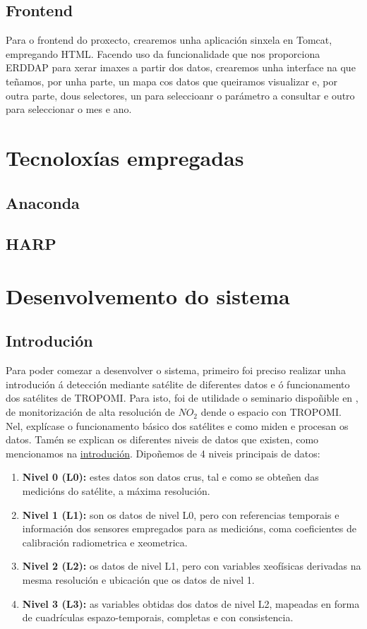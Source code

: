 \subsection{Frontend}\label{frontend}
Para o frontend do proxecto, crearemos unha aplicación sinxela en Tomcat, empregando HTML. Facendo uso da funcionalidade que nos proporciona ERDDAP para xerar imaxes a partir dos datos, crearemos
unha interface na que teñamos, por unha parte, un mapa cos datos que queiramos visualizar e, por outra parte, dous selectores, un para seleccioanr o parámetro a consultar e outro para seleccionar
o mes e ano.

\section{Tecnoloxías empregadas}\label{tecnoloxias}
\subsection{Anaconda}\label{anaconda}

\subsection{HARP}\label{harp}

\section{Desenvolvemento do sistema}\label{desenvolvemento}
\subsection{Introdución}
Para poder comezar a desenvolver o sistema, primeiro foi preciso realizar unha introdución á detección mediante satélite de diferentes datos e ó funcionamento dos satélites de TROPOMI. Para isto,
foi de utilidade o seminario dispoñible en \cite{ARSETformation}, de monitorización de alta resolución de $NO_2$ dende o espacio con TROPOMI. Nel, explícase o funcionamento básico dos satélites e
como miden e procesan os datos. Tamén se explican os diferentes niveis de datos que existen, como mencionamos na \hyperref[introducion]{introdución}. Dipoñemos de 4 niveis principais de datos:
\begin{enumerate}
    \item \textbf{Nivel 0 (L0):} estes datos son datos crus, tal e como se obteñen das medicións do satélite, a máxima resolución.
    \item \textbf{Nivel 1 (L1):} son os datos de nivel L0, pero con referencias temporais e información dos sensores empregados para as medicións, coma coeficientes de calibración radiometrica e
    xeometrica.
    \item \textbf{Nivel 2 (L2):} os datos de nivel L1, pero con variables xeofísicas derivadas na mesma resolución e ubicación que os datos de nivel 1.
    \item \textbf{Nivel 3 (L3):} as variables obtidas dos datos de nivel L2, mapeadas en forma de cuadrículas espazo-temporais, completas e con consistencia.
\end{enumerate}

